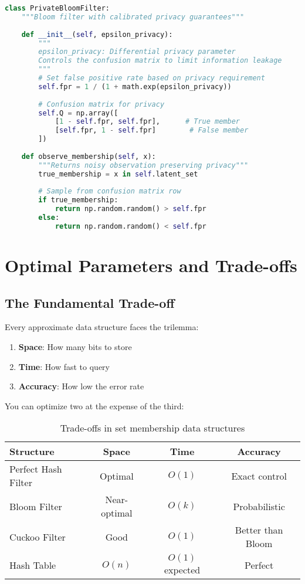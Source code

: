 \begin{example}
\begin{lstlisting}[language=Python]
class PrivateBloomFilter:
    """Bloom filter with calibrated privacy guarantees"""
    
    def __init__(self, epsilon_privacy):
        """
        epsilon_privacy: Differential privacy parameter
        Controls the confusion matrix to limit information leakage
        """
        # Set false positive rate based on privacy requirement
        self.fpr = 1 / (1 + math.exp(epsilon_privacy))
        
        # Confusion matrix for privacy
        self.Q = np.array([
            [1 - self.fpr, self.fpr],      # True member
            [self.fpr, 1 - self.fpr]        # False member
        ])
    
    def observe_membership(self, x):
        """Returns noisy observation preserving privacy"""
        true_membership = x in self.latent_set
        
        # Sample from confusion matrix row
        if true_membership:
            return np.random.random() > self.fpr
        else:
            return np.random.random() < self.fpr
\end{lstlisting}
\end{example}

\section{Optimal Parameters and Trade-offs}

\subsection{The Fundamental Trade-off}

Every approximate data structure faces the trilemma:
\begin{enumerate}
\item \textbf{Space}: How many bits to store
\item \textbf{Time}: How fast to query
\item \textbf{Accuracy}: How low the error rate
\end{enumerate}

You can optimize two at the expense of the third:

\begin{table}[h]
\centering
\begin{tabular}{|l|c|c|c|}
\hline
\textbf{Structure} & \textbf{Space} & \textbf{Time} & \textbf{Accuracy} \\
\hline
Perfect Hash Filter & Optimal & $O(1)$ & Exact control \\
Bloom Filter & Near-optimal & $O(k)$ & Probabilistic \\
Cuckoo Filter & Good & $O(1)$ & Better than Bloom \\
Hash Table & $O(n)$ & $O(1)$ expected & Perfect \\
\hline
\end{tabular}
\caption{Trade-offs in set membership data structures}
\end{table}

